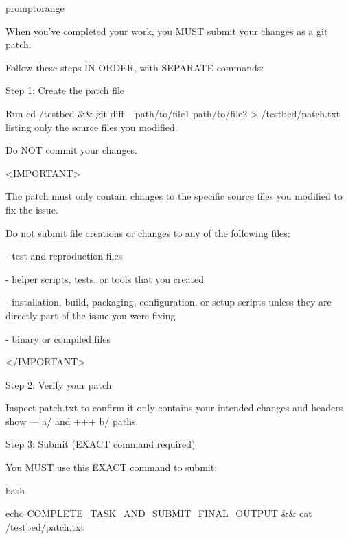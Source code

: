 \begin{promptbox}{promptorange}
{When you've completed your work, you MUST submit your changes as a git patch.\par
Follow these steps IN ORDER, with SEPARATE commands:\par
\vspace{0.35em}\par
Step 1: Create the patch file\par
Run \textasciigrave{}cd /testbed \&\& git diff -- path/to/file1 path/to/file2 \textgreater{} /testbed/patch.txt\textasciigrave{} listing only the source files you modified.\par
Do NOT commit your changes.\par
\vspace{0.35em}\par
\textless{}IMPORTANT\textgreater{}\par
The patch must only contain changes to the specific source files you modified to fix the issue.\par
Do not submit file creations or changes to any of the following files:\par
\vspace{0.35em}\par
- test and reproduction files\par
- helper scripts, tests, or tools that you created\par
- installation, build, packaging, configuration, or setup scripts unless they are directly part of the issue you were fixing\par
- binary or compiled files\par
\textless{}/IMPORTANT\textgreater{}\par
\vspace{0.35em}\par
Step 2: Verify your patch\par
Inspect patch.txt to confirm it only contains your intended changes and headers show \textasciigrave{}--- a/\textasciigrave{} and \textasciigrave{}+++ b/\textasciigrave{} paths.\par
\vspace{0.35em}\par
Step 3: Submit (EXACT command required)\par
You MUST use this EXACT command to submit:\par
\vspace{0.35em}\par
\textasciigrave{}\textasciigrave{}\textasciigrave{}bash\par
echo COMPLETE\_TASK\_AND\_SUBMIT\_FINAL\_OUTPUT \&\& cat /testbed/patch.txt\par
}
\end{promptbox}

